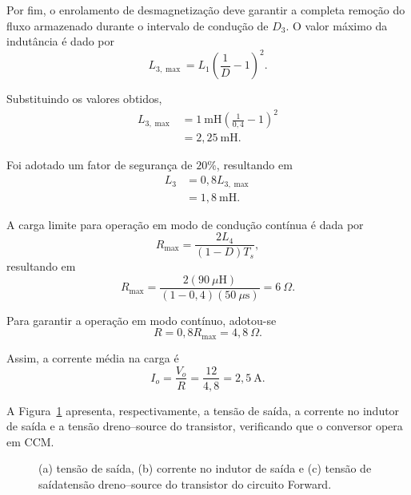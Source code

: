 Por fim, o enrolamento de desmagnetização deve garantir a completa remoção do fluxo armazenado durante o intervalo de condução de $D_3$. O valor máximo da indutância é dado por~\cite{forward_notas}
\begin{equation*}
	L_{3,\max}
	=
	L_1
	\left(\frac{1}{D}-1\right)^2.
\end{equation*}

Substituindo os valores obtidos,
\begin{equation*}
	\begin{aligned}
		L_{3,\max}
		&=
		1~\mathrm{mH}
		\left(\frac{1}{0{,}4}-1\right)^2
		\\
		&=2{,}25~\mathrm{mH}.
	\end{aligned}
\end{equation*}

Foi adotado um fator de segurança de $20\%$, resultando em
\begin{equation*}
	\begin{aligned}
		L_3
		&=
		0{,}8L_{3,\max}
		\\
		&=
		1{,}8~\mathrm{mH}.
	\end{aligned}
\end{equation*}

A carga limite para operação em modo de condução contínua é dada por
\begin{equation*}
	R_{\max}
	=
	\frac{2L_4}
	{(1-D)T_s},
\end{equation*}
resultando em
\begin{equation*}
	R_{\max}
	=
	\frac{2(90~\mu\mathrm{H})}
	{(1-0{,}4)(50~\mu\mathrm{s})}
	=
	6~\Omega.
\end{equation*}

Para garantir a operação em modo contínuo, adotou-se
\begin{equation*}
	R
	=
	0{,}8R_{\max}
	=
	4{,}8~\Omega.
\end{equation*}

Assim, a corrente média na carga é
\begin{equation*}
	I_o
	=
	\frac{V_o}{R}
	=
	\frac{12}{4{,}8}
	=
	2{,}5~\mathrm{A}.
\end{equation*}

A Figura~\ref{fig:ex5} apresenta, respectivamente, a tensão de saída, a corrente no indutor de saída e a tensão dreno--source do transistor, verificando que o conversor opera em CCM.
\begin{figure}[htb!]
	\centering
	
	\caption{(a) tensão de saída, (b) corrente no indutor de saída e (c) tensão de saídatensão dreno--source do transistor do circuito Forward.}
	\label{fig:ex5}
\end{figure}

